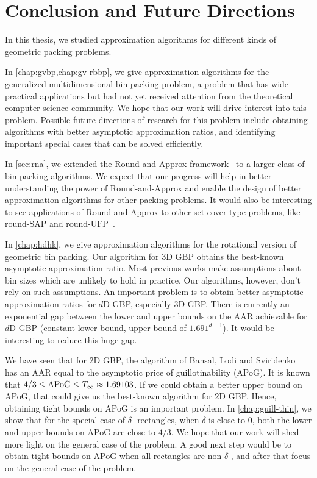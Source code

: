 \chapter{Conclusion and Future Directions}
\label{chap:conclusion}

In this thesis, we studied approximation algorithms for different kinds of
geometric packing problems.

In \cref{chap:gvbp,chap:gv-rbbp}, we give approximation algorithms for the
generalized multidimensional bin packing problem, a problem that has
wide practical applications but had not yet received attention from the
theoretical computer science community.
We hope that our work will drive interest into this problem.
Possible future directions of research for this problem include
obtaining algorithms with better asymptotic approximation ratios,
and identifying important special cases that can be solved efficiently.

In \cref{sec:rna}, we extended the Round-and-Approx framework~\cite{rna,bansal2014binpacking}
to a larger class of bin packing algorithms.
We expect that our progress will help in better understanding the power of
Round-and-Approx and enable the design of better approximation algorithms
for other packing problems.
It would also be interesting to see applications of Round-and-Approx to other
set-cover type problems, like round-SAP and round-UFP~\cite{ElbassioniGGKNP12}.

In \cref{chap:hdhk}, we give approximation algorithms for the rotational version
of geometric bin packing. Our algorithm for 3D GBP
obtains the best-known asymptotic approximation ratio.
Most previous works make assumptions about bin sizes which are unlikely
to hold in practice. Our algorithms, however, don't rely on such assumptions.
An important problem is to obtain better asymptotic approximation
ratios for $d$D GBP, especially 3D GBP.
There is currently an exponential gap between the lower and upper bounds
on the AAR achievable for $d$D GBP (constant lower bound, upper bound of $1.691^{d-1}$).
It would be interesting to reduce this huge gap.

We have seen that for 2D GBP, the algorithm of Bansal, Lodi and Sviridenko~\cite{bansal2005tale}
has an AAR equal to the asymptotic price of guillotinability (APoG).
It is known that $4/3 \le \mathrm{APoG} \le T_{\infty} \approx 1.69103$.
If we could obtain a better upper bound on APoG, that could
give us the best-known algorithm for 2D GBP.
Hence, obtaining tight bounds on APoG is an important problem.
In \cref{chap:guill-thin}, we show that for the special case of $\delta$-\thin{}
rectangles, when $\delta$ is close to 0, both the lower and upper bounds
on APoG are close to $4/3$.
We hope that our work will shed more light on the general case of the problem.
A good next step would be to obtain tight bounds on APoG
when all rectangles are non-$\delta$-\thin{},
and after that focus on the general case of the problem.

